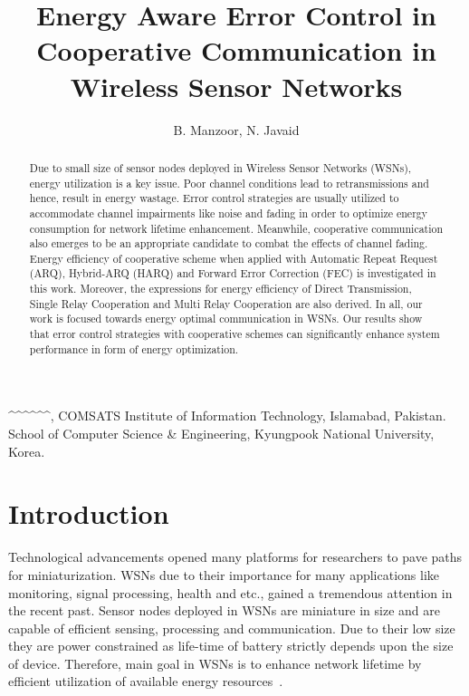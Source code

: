 \documentclass{sig-alternate}
\begin{document}
\title{Energy Aware Error Control in Cooperative Communication in Wireless Sensor Networks}

\author{B. Manzoor, N. Javaid}^{\ddag}^{\ddag}^{\sharp}^{\sharp}^{\ddag}^{\CAST, COMSATS Institute of Information Technology, Islamabad, Pakistan.\\
        School of Computer Science \& Engineering, Kyungpook National University, Korea.\\
}

\maketitle
\begin{abstract}
Due to small size of sensor nodes deployed in Wireless Sensor Networks (WSNs), energy utilization is a key issue. Poor channel conditions lead to retransmissions and hence, result in energy wastage. Error control strategies are usually utilized to accommodate channel impairments like noise and fading in order to optimize energy consumption for network lifetime enhancement. Meanwhile, cooperative communication also emerges to be an appropriate candidate to combat the effects of channel fading. Energy efficiency of cooperative scheme when applied with Automatic Repeat Request (ARQ), Hybrid-ARQ (HARQ) and Forward Error Correction (FEC) is investigated in this work. Moreover, the expressions for energy efficiency of Direct Transmission, Single Relay Cooperation and Multi Relay Cooperation are also derived. In all, our work is focused towards energy optimal communication in WSNs. Our results show that error control strategies with cooperative schemes can significantly enhance system performance in form of energy optimization.
\end{abstract}



\section{Introduction}
\label{sec:intro}

Technological advancements opened many platforms for researchers to pave paths for miniaturization. WSNs due to their importance for many applications like monitoring, signal processing, health and etc., gained a tremendous attention in the recent past. Sensor nodes deployed in WSNs are miniature in size and are capable of efficient sensing, processing and communication. Due to their low size they are power constrained as life-time of battery strictly depends upon the size of device. Therefore, main goal in WSNs is to enhance network lifetime by efficient utilization of available energy resources~\cite{10}.
\end{document}
